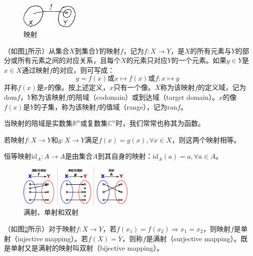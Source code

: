 \documentclass[main.tex]{subfiles}
\begin{document}
\begin{figure}[htbp]
\centering
\includegraphics[width=0.25\textwidth]{images/II.1.1.eps}
\caption{映射}
\label{fig:II.1.1}
\end{figure}

\begin{definition}[映射]
（如图\ref{fig:II.1.1}所示）从集合$X$到集合$Y$的映射$f$，记为$f:X\rightarrow Y$，是$X$的所有元素与$Y$的部分或所有元素之间的对应关系，且每个$X$的元素只对应$Y$的一个元素。如果$y\in Y$是$x\in X$通过映射$f$的对应，则可写成：
\[y=f\left(x\right)\text{或}x\mapsto f\left(x\right)\text{或}f:x\mapsto y\]
并称$f\left(x\right)$是$x$的像。按上述定义，$x$只有一个像。$X$称为该映射$f$的定义域，记为$\mathrm{dom}f$，$Y$称为该映射$f$的陪域（codomain）或到达域（target domain）。$x$的像$f\left(x\right)$是$Y$的子集，称为该映射$f$的值域（range），记为$\mathrm{ran}f$。
\end{definition}

当映射的陪域是实数集$\mathbb{R}^n$或复数集$\mathbb{C}^n$时，我们常常也称其为函数。

\begin{definition}[映射的相等]
若映射$f:X\rightarrow Y$和$g:X\rightarrow Y$满足$f\left(x\right)=g\left(x\right),\forall x\in X$，则这两个映射相等。
\end{definition}

\begin{definition}[恒等映射]
恒等映射$\mathrm{id}_A:A\rightarrow A$是由集合$A$到其自身的映射：$\mathrm{id}_A\left(a\right)=a,\forall a\in A$。
\end{definition}

\begin{figure}[htbp]
\centering
\includegraphics[width=0.5\textwidth]{images/II.1.2.eps}
\caption{满射、单射和双射}
\label{fig:II.1.2}
\end{figure}

\begin{definition}[单射、双射、满射]
（如图\ref{fig:II.1.2}所示）对于映射$f:X\rightarrow Y$，若$f\left(x_1\right)=f\left(x_2\right)\Rightarrow x_1=x_2$，则映射$f$是单射（injective mapping）。若$f\left(X\right)=Y$，则称$f$是满射（surjective mapping）。既是单射又是满射的映射叫双射（bijective mapping）。
\end{definition}
\end{document}
